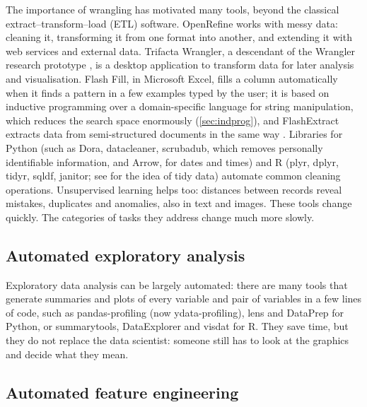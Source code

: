 The importance of wrangling has motivated many tools, beyond the classical extract--transform--load
(ETL) software. OpenRefine works with messy data: cleaning it, transforming it from one format into
another, and extending it with web services and external data. Trifacta Wrangler, a descendant of
the Wrangler research prototype \citep{kandel2011wrangler}, is a desktop application to transform data
for later analysis and visualisation. Flash Fill, in Microsoft Excel, fills a column automatically when
it finds a pattern in a few examples typed by the user; it is based on inductive programming over a
domain-specific language for string manipulation, which reduces the search space enormously
(\cref{sec:indprog}), and FlashExtract extracts data from semi-structured documents in the same way
\citep{gulwani2011automating,le2014flashextract}. Libraries for Python (such as Dora, datacleaner,
scrubadub, which removes personally identifiable information, and Arrow, for dates and times) and R
(plyr, dplyr, tidyr, sqldf, janitor; see \citealp{wickham2014tidy} for the idea of tidy data) automate
common cleaning operations. Unsupervised learning helps too: distances between records reveal
mistakes, duplicates and anomalies, also in text and images. These tools change quickly. The categories of
tasks they address change much more slowly.

\subsection{Automated exploratory analysis}

Exploratory data analysis can be largely automated: there are many tools that generate summaries
and plots of every variable and pair of variables in a few lines of code, such as pandas-profiling
(now ydata-profiling), lens and DataPrep for Python, or summarytools, DataExplorer and visdat for R.
They save time, but they do not replace the data scientist: someone still has to look at the
graphics and decide what they mean.

\subsection{Automated feature engineering}

